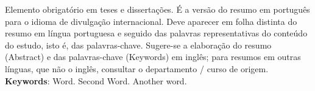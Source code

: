 
\begin{resumo}[ABSTRACT]
\begin{SingleSpacing}

Elemento obrigatório em teses e dissertações. É a versão do resumo em português para o idioma de divulgação internacional. Deve aparecer em folha distinta do resumo em língua portuguesa e seguido das palavras representativas do conteúdo do estudo, isto é, das palavras-chave. Sugere-se a elaboração do resumo (Abstract) e das palavras-chave (Keywords) em inglês; para resumos em outras línguas, que não o inglês, consultar o departamento / curso de origem.\\

\textbf{Keywords}: Word. Second Word. Another word.

\end{SingleSpacing}
\end{resumo}

